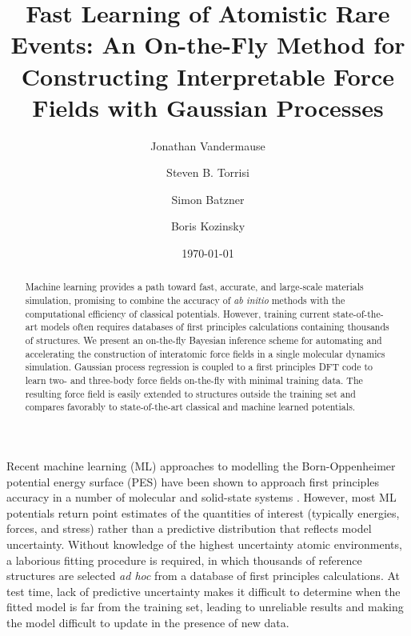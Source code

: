 \documentclass[%
reprint,
superscriptaddress,
amsmath,amssymb,
aps,
prl,
]{revtex4-1}
\begin{document}
\title{Fast Learning of Atomistic Rare Events: An On-the-Fly Method for Constructing Interpretable Force Fields with Gaussian Processes}

\author{Jonathan Vandermause}

\author{Steven B. Torrisi}

\author{Simon Batzner}

\author{Boris Kozinsky}


\date{\today}

\begin{abstract}
  Machine learning provides a path toward fast, accurate, and large-scale materials simulation, promising to combine the accuracy of \textit{ab initio} methods with the computational efficiency of classical potentials. However, training current state-of-the-art models often requires databases of first principles calculations containing thousands of structures. We present an on-the-fly Bayesian inference scheme for automating and accelerating the construction of interatomic force fields in a single molecular dynamics simulation. Gaussian process regression is coupled to a first principles DFT code to learn two- and three-body force fields on-the-fly with minimal training data. The resulting force field is easily extended to structures outside the training set and compares favorably to state-of-the-art classical and machine learned potentials.
\end{abstract}

\maketitle
Recent machine learning (ML) approaches to modelling the Born-Oppenheimer potential energy surface (PES) have been shown to approach first principles accuracy in a number of molecular and solid-state systems \cite{behler2011neural, deringer2017machine, chmiela2017machine, schutt2017schnet}. However, most ML potentials return point estimates of the quantities of interest (typically energies, forces, and stress) rather than a predictive distribution that reflects model uncertainty. Without knowledge of the highest uncertainty atomic environments, a laborious fitting procedure is required, in which thousands of reference structures are selected \textit{ad hoc} from a database of first principles calculations. At test time, lack of predictive uncertainty makes it difficult to determine when the fitted model is far from the training set, leading to unreliable results and making the model difficult to update in the presence of new data.
\end{document}
